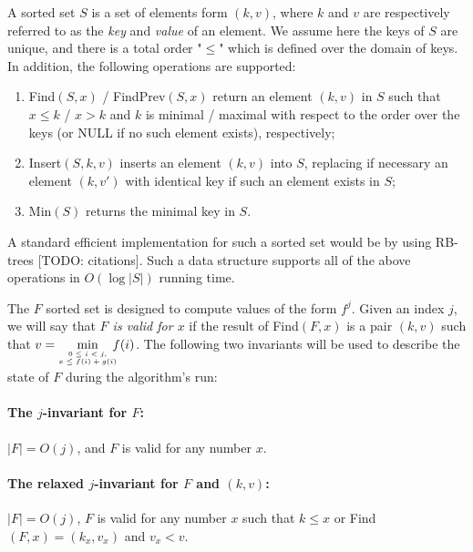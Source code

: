 A sorted set $S$ is a set of elements form $(k, v)$, where $k$ and $v$ are respectively referred to as the \emph{key} and \emph{value} of an element. We assume here the keys of $S$ are unique, and there is a total order "$\leq$" which is defined over the domain of keys.
In addition, the following operations are supported: 
\begin{enumerate}
	\item Find$(S, x)$ / FindPrev$(S, x)$ return an element $(k, v)$ in $S$ such that $x \leq k$ / $x > k$  and $k$ is minimal / maximal with respect to the order over the keys (or NULL if no such element exists), respectively;
	\item Insert$(S, k, v)$ inserts an element $(k, v)$ into $S$, replacing if necessary an element $(k, v')$ with identical key if such an element exists in $S$;
	\item Min$(S)$ returns the minimal key in $S$.
\end{enumerate}

A standard efficient implementation for such a sorted set would be by using RB-trees [TODO: citations]. Such a data structure supports all of the above operations in $O(\log |S|)$ running time.

The $F$ sorted set is designed to compute values of the form $f^j$.
Given an index $j$, we will say that \emph{$F$ is valid for $x$} if the result of Find$(F, x)$ is a pair $(k, v)$ such that $v = \hspace{-.5em}\min\limits_{{\tiny \begin{array}{c}
		0 \leq i < j, \\
		x \leq f(i) + g(i)
		\end{array}}} \hspace{-1em} f(i)$.
The following two invariants will be used to describe the state of $F$ during the algorithm's run:

\paragraph{The $j$-invariant for $F$:}
$|F| = O(j)$, and $F$ is valid for any number $x$.

\paragraph{The relaxed $j$-invariant for $F$ and $(k, v)$:}
$|F| = O(j)$, $F$ is valid for any number $x$ such that $k \leq x$ or Find$(F, x) = (k_x, v_x)$ and $v_x < v$.
\bigskip

